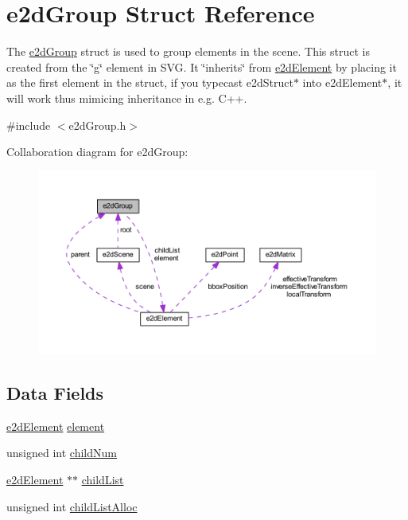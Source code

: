 \hypertarget{structe2d_group}{\section{e2d\-Group Struct Reference}
\label{structe2d_group}
}


The \hyperlink{structe2d_group}{e2d\-Group} struct is used to group elements in the scene. This struct is created from the \char`\"{}g\char`\"{} element in S\-V\-G. It \char`\"{}inherits\char`\"{} from \hyperlink{structe2d_element}{e2d\-Element} by placing it as the first element in the struct, if you typecast e2d\-Struct$\ast$ into e2d\-Element$\ast$, it will work thus mimicing inheritance in e.\-g. C++.  




{\ttfamily \#include $<$e2d\-Group.\-h$>$}



Collaboration diagram for e2d\-Group\-:\nopagebreak
\begin{figure}[H]
\begin{center}
\leavevmode
\includegraphics[width=350pt]{structe2d_group__coll__graph}
\end{center}
\end{figure}
\subsection*{Data Fields}
\begin{DoxyCompactItemize}
\item 
\hyperlink{structe2d_element}{e2d\-Element} \hyperlink{structe2d_group_a55bc7a3a0af41fba9e5b91f390c5928c}{element}
\item 
unsigned int \hyperlink{structe2d_group_a0af3697c2c9df6ed0ddd340cded35d65}{child\-Num}
\item 
\hyperlink{structe2d_element}{e2d\-Element} $\ast$$\ast$ \hyperlink{structe2d_group_a55f6dde874716dc99dcd270fc0999a01}{child\-List}
\item 
unsigned int \hyperlink{structe2d_group_a9c89d7cf35b835ef1917855c78a79cc5}{child\-List\-Alloc}
\end{DoxyCompactItemize}


